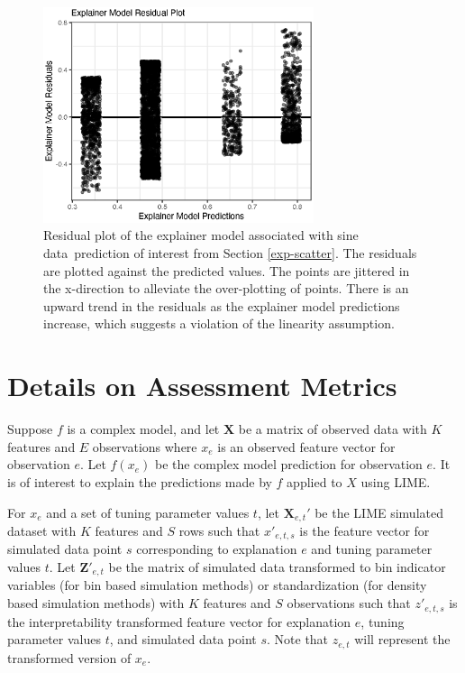 \documentclass[AMS,STIX2COL]{WileyNJD-v2}\usepackage[]{graphicx}\usepackage[]{color}
\newenvironment{knitrout}{}{} %
\newcommand{\data}{sine data}
\begin{document}
\begin{figure}[!thp]
\begin{knitrout}
\color{fgcolor}

{\centering \includegraphics[width=3.125in]{figure-C3-1} 

}



\end{knitrout}
\caption{Residual plot of the explainer model associated with \data \ prediction of interest from Section \ref{exp-scatter}. The residuals are plotted against the predicted values. The points are jittered in the x-direction to alleviate the over-plotting of points. There is an upward trend in the residuals as the explainer model predictions increase, which suggests a violation of the linearity assumption.}
\label{fig:figure-C3}
\end{figure}

\section{Details on Assessment Metrics} \label{metric-details}

Suppose $f$ is a complex model, and let $\textbf{X}$ be a matrix of observed data with $K$ features and $E$ observations where $x_e$ is an observed feature vector for observation $e$. Let $f(x_e)$ be the complex model prediction for observation $e$. It is of interest to explain the predictions made by $f$ applied to $X$ using LIME. 

For $x_e$ and a set of tuning parameter values $t$, let $\textbf{X}_{e,t}'$ be the LIME simulated dataset with $K$ features and $S$ rows such that $x'_{e,t,s}$ is the feature vector for simulated data point $s$ corresponding to explanation $e$ and tuning parameter values $t$. Let $\textbf{Z}'_{e,t}$ be the matrix of simulated data transformed to bin indicator variables (for bin based simulation methods) or standardization (for density based simulation methods) with $K$ features and $S$ observations such that $z'_{e,t,s}$ is the interpretability transformed feature vector for explanation $e$, tuning parameter values $t$, and simulated data point $s$. Note that $z_{e,t}$ will represent the  transformed version of $x_e$.
\end{document}
